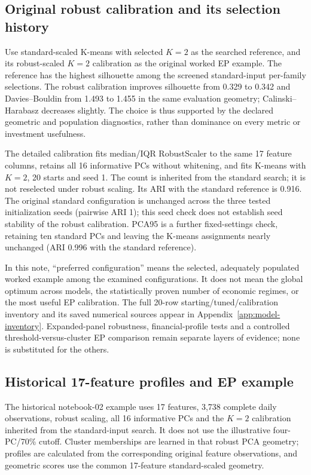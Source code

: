 \documentclass[11pt,a4paper]{article}
\begin{document}


\subsection{Original robust calibration and its selection history}

Use standard-scaled K-means with selected $K=2$ as the searched reference, and its robust-scaled $K=2$ calibration as the original worked EP example. The reference has the highest silhouette among the screened standard-input per-family selections. The robust calibration improves silhouette from 0.329 to 0.342 and Davies--Bouldin from 1.493 to 1.455 in the same evaluation geometry; Calinski--Harabasz decreases slightly. The choice is thus supported by the declared geometric and population diagnostics, rather than dominance on every metric or investment usefulness.

The detailed calibration fits median/IQR RobustScaler to the same 17 feature columns, retains all 16 informative PCs without whitening, and fits K-means with $K=2$, 20 starts and seed 1. The count is inherited from the standard search; it is not reselected under robust scaling. Its ARI with the standard reference is 0.916. The original standard configuration is unchanged across the three tested initialization seeds (pairwise ARI 1); this seed check does not establish seed stability of the robust calibration. PCA95 is a further fixed-settings check, retaining ten standard PCs and leaving the K-means assignments nearly unchanged (ARI 0.996 with the standard reference).

In this note, ``preferred configuration'' means the selected, adequately populated worked example among the examined configurations. It does not mean the global optimum across models, the statistically proven number of economic regimes, or the most useful EP calibration. The full 20-row starting/tuned/calibration inventory and its saved numerical sources appear in Appendix~\ref{app:model-inventory}. Expanded-panel robustness, financial-profile tests and a controlled threshold-versus-cluster EP comparison remain separate layers of evidence; none is substituted for the others.


\subsection{Historical 17-feature profiles and EP example}
\label{sec:preliminary}

The historical notebook-02 example uses 17 features, 3,738 complete daily observations, robust scaling, all 16 informative PCs and the $K=2$ calibration inherited from the standard-input search. It does not use the illustrative four-PC/70\% cutoff. Cluster memberships are learned in that robust PCA geometry; profiles are calculated from the corresponding original feature observations, and geometric scores use the common 17-feature standard-scaled geometry.
\end{document}
